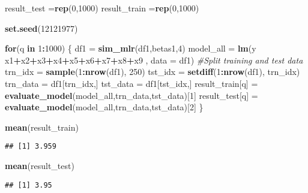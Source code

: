 \documentclass[
]{article}
\newenvironment{Shaded}{\begin{snugshade}}{\end{snugshade}}
\newcommand{\CommentTok}[1]{\textcolor[rgb]{0.56,0.35,0.01}{\textit{#1}}}
\newcommand{\ControlFlowTok}[1]{\textcolor[rgb]{0.13,0.29,0.53}{\textbf{#1}}}
\newcommand{\DataTypeTok}[1]{\textcolor[rgb]{0.13,0.29,0.53}{#1}}
\newcommand{\DecValTok}[1]{\textcolor[rgb]{0.00,0.00,0.81}{#1}}
\newcommand{\KeywordTok}[1]{\textcolor[rgb]{0.13,0.29,0.53}{\textbf{#1}}}
\newcommand{\NormalTok}[1]{#1}
\newcommand{\OperatorTok}[1]{\textcolor[rgb]{0.81,0.36,0.00}{\textbf{#1}}}
\newcommand{\StringTok}[1]{\textcolor[rgb]{0.31,0.60,0.02}{#1}}
\begin{document}
\begin{Shaded}
\begin{Highlighting}[]
\NormalTok{result_test =}\KeywordTok{rep}\NormalTok{(}\DecValTok{0}\NormalTok{,}\DecValTok{1000}\NormalTok{)  }
\NormalTok{result_train =}\KeywordTok{rep}\NormalTok{(}\DecValTok{0}\NormalTok{,}\DecValTok{1000}\NormalTok{)  }
  
\KeywordTok{set.seed}\NormalTok{(}\DecValTok{12121977}\NormalTok{)}

\ControlFlowTok{for}\NormalTok{(q }\ControlFlowTok{in} \DecValTok{1}\OperatorTok{:}\DecValTok{1000}\NormalTok{)}
\NormalTok{\{}
\NormalTok{  df1 =}\StringTok{ }\KeywordTok{sim_mlr}\NormalTok{(df1,betas1,}\DecValTok{4}\NormalTok{)}
\NormalTok{  model_all =}\StringTok{ }\KeywordTok{lm}\NormalTok{(y }\OperatorTok{~}\StringTok{ }\NormalTok{x1}\OperatorTok{+}\NormalTok{x2}\OperatorTok{+}\NormalTok{x3}\OperatorTok{+}\NormalTok{x4}\OperatorTok{+}\NormalTok{x5}\OperatorTok{+}\NormalTok{x6}\OperatorTok{+}\NormalTok{x7}\OperatorTok{+}\NormalTok{x8}\OperatorTok{+}\NormalTok{x9 , }\DataTypeTok{data =}\NormalTok{ df1)}
  \CommentTok{#Split training and test data}
\NormalTok{  trn_idx =}\StringTok{ }\KeywordTok{sample}\NormalTok{(}\DecValTok{1}\OperatorTok{:}\KeywordTok{nrow}\NormalTok{(df1), }\DecValTok{250}\NormalTok{)}
\NormalTok{  tst_idx =}\StringTok{ }\KeywordTok{setdiff}\NormalTok{(}\DecValTok{1}\OperatorTok{:}\KeywordTok{nrow}\NormalTok{(df1), trn_idx)}
\NormalTok{  trn_data =}\StringTok{ }\NormalTok{df1[trn_idx,]}
\NormalTok{  tst_data  =}\StringTok{ }\NormalTok{df1[tst_idx,]}
\NormalTok{  result_train[q] =}\StringTok{ }\KeywordTok{evaluate_model}\NormalTok{(model_all,trn_data,tst_data)[}\DecValTok{1}\NormalTok{]}
\NormalTok{  result_test[q] =}\StringTok{ }\KeywordTok{evaluate_model}\NormalTok{(model_all,trn_data,tst_data)[}\DecValTok{2}\NormalTok{]}
\NormalTok{\}}

\KeywordTok{mean}\NormalTok{(result_train)}
\end{Highlighting}
\end{Shaded}

\begin{verbatim}
## [1] 3.959
\end{verbatim}

\begin{Shaded}
\begin{Highlighting}[]
\KeywordTok{mean}\NormalTok{(result_test)}
\end{Highlighting}
\end{Shaded}

\begin{verbatim}
## [1] 3.95
\end{verbatim}
\end{document}
